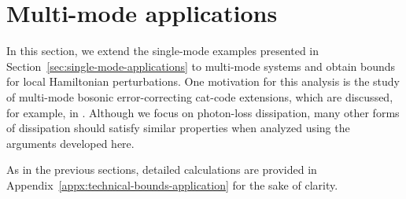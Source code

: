 \documentclass[11pt]{article}
\theoremstyle{myplain}
\theoremstyle{mydefinition}
\theoremstyle{remark}
\DeclareMathOperator{\1}{\mathds{1}}
\begin{document}
\section{Multi-mode applications}\label{sec:multi-mode-applications}
    In this section, we extend the single-mode examples presented in Section~\ref{sec:single-mode-applications} to multi-mode systems and obtain bounds for local Hamiltonian perturbations. One motivation for this analysis is the study of multi-mode bosonic error-correcting cat-code extensions, which are discussed, for example, in \cite{Jain.2024}. Although we focus on photon-loss dissipation, many other forms of dissipation should satisfy similar properties when analyzed using the arguments developed here.

    \noindent As in the previous sections, detailed calculations are provided in Appendix~\ref{appx:technical-bounds-application} for the sake of clarity.
\end{document}
